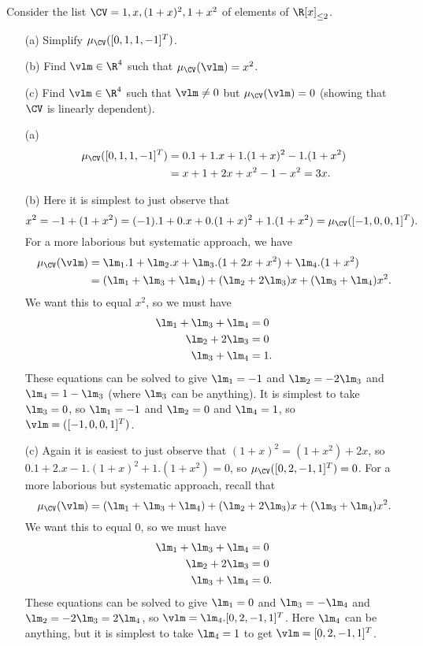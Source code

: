 \begin{exercise}\label{ex-various-polys}
 Consider the list $\CV=1,x,(1+x)^2,1+x^2$ of elements of
 $\R[x]_{\leq 2}$.
 \begin{itemize}\renewcommand{\itemsep}{1ex}
  \item[(a)] Simplify $\mu_{\CV}([0,1,1,-1]^T)$.
  \item[(b)] Find $\vlm\in\R^4$ such that
   $\mu_\CV(\vlm)=x^2$.
  \item[(c)] Find $\vlm\in\R^4$ such that $\vlm\neq 0$ but
   $\mu_\CV(\vlm)=0$ (showing that $\CV$ is linearly
   dependent).
 \end{itemize}
\end{exercise}
\begin{solution}
 \begin{itemize}
  \item[(a)] 
   \begin{align*}
    \mu_\CV([0,1,1,-1]^T)
     &= 0.1 + 1.x + 1.(1+x)^2 - 1.(1+x^2) \\
     &= x + 1 + 2x + x^2 - 1 - x^2 = 3x.
   \end{align*}
  \item[(b)] Here it is simplest to just observe that 
   \[ x^2 =
       -1 + (1+x^2) = (-1). 1 + 0.x + 0.(1+x)^2 + 1.(1+x^2) = 
       \mu_\CV([-1,0,0,1]^T).
   \]
   For a more laborious but systematic approach, we have
   \begin{align*}
    \mu_\CV(\vlm)
     &= \lm_1.1 + \lm_2.x + \lm_3.(1+2x+x^2) + \lm_4.(1+x^2) \\
     &= (\lm_1+\lm_3+\lm_4) + (\lm_2+2\lm_3)x + (\lm_3+\lm_4)x^2.
   \end{align*}
   We want this to equal $x^2$, so we must have
   \begin{align*}
    \lm_1 + \lm_3 + \lm_4 &= 0 \\
    \lm_2 + 2\lm_3 &= 0 \\
    \lm_3 + \lm_4 &= 1.
   \end{align*}
   These equations can be solved to give $\lm_1=-1$ and
   $\lm_2=-2\lm_3$ and $\lm_4=1-\lm_3$ (where $\lm_3$ can be
   anything).  It is simplest to take $\lm_3=0$, so
   $\lm_1=-1$ and $\lm_2=0$ and $\lm_4=1$, so
   $\vlm=([-1,0,0,1]^T)$.  
  \item[(c)] Again it is easiest to just observe that
   $(1+x)^2=(1+x^2)+2x$, so
   $0.1 + 2.x - 1.(1+x)^2 + 1.(1+x^2)=0$, so
   $\mu_\CV([0,2,-1,1]^T)=0$.  
   For a more laborious but systematic approach, recall that
   \[ \mu_\CV(\vlm) =
      (\lm_1+\lm_3+\lm_4) + (\lm_2+2\lm_3)x + (\lm_3+\lm_4)x^2.
   \]
   We want this to equal $0$, so we must have
   \begin{align*}
    \lm_1 + \lm_3 + \lm_4 &= 0 \\
    \lm_2 + 2\lm_3 &= 0 \\
    \lm_3 + \lm_4 &= 0.
   \end{align*}
   These equations can be solved to give $\lm_1=0$ and
   $\lm_3=-\lm_4$ and $\lm_2=-2\lm_3=2\lm_4$, so
   $\vlm=\lm_4.[0,2,-1,1]^T$.  Here $\lm_4$ can be anything,
   but it is simplest to take $\lm_4=1$ to get
   $\vlm=[0,2,-1,1]^T$. 
 \end{itemize}
\end{solution}

